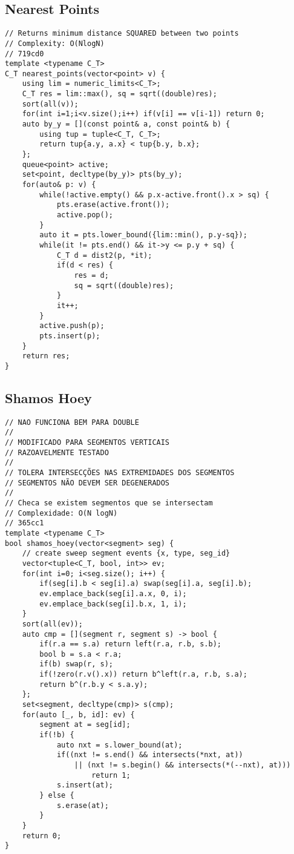 \documentclass{article}
\begin{document}
\subsection{Nearest Points}
\begin{verbatim}
// Returns minimum distance SQUARED between two points
// Complexity: O(NlogN)
// 719cd0
template <typename C_T>
C_T nearest_points(vector<point> v) {
	using lim = numeric_limits<C_T>;
	C_T res = lim::max(), sq = sqrt((double)res);
	sort(all(v));
	for(int i=1;i<v.size();i++) if(v[i] == v[i-1]) return 0;
	auto by_y = [](const point& a, const point& b) {
		using tup = tuple<C_T, C_T>;
		return tup{a.y, a.x} < tup{b.y, b.x};
	};
	queue<point> active;
	set<point, decltype(by_y)> pts(by_y);
	for(auto& p: v) {
		while(!active.empty() && p.x-active.front().x > sq) {
			pts.erase(active.front());
			active.pop();
		}
		auto it = pts.lower_bound({lim::min(), p.y-sq});
		while(it != pts.end() && it->y <= p.y + sq) {
			C_T d = dist2(p, *it);
			if(d < res) {
				res = d;
				sq = sqrt((double)res);
			}
			it++;
		}
		active.push(p);
		pts.insert(p);
	}
	return res;
}
\end{verbatim}
\subsection{Shamos Hoey}
\begin{verbatim}
// NAO FUNCIONA BEM PARA DOUBLE
//
// MODIFICADO PARA SEGMENTOS VERTICAIS
// RAZOAVELMENTE TESTADO
//
// TOLERA INTERSECÇÕES NAS EXTREMIDADES DOS SEGMENTOS
// SEGMENTOS NÃO DEVEM SER DEGENERADOS
//
// Checa se existem segmentos que se intersectam
// Complexidade: O(N logN)
// 365cc1
template <typename C_T>
bool shamos_hoey(vector<segment> seg) {
	// create sweep segment events {x, type, seg_id}
	vector<tuple<C_T, bool, int>> ev;
	for(int i=0; i<seg.size(); i++) {
		if(seg[i].b < seg[i].a) swap(seg[i].a, seg[i].b);
		ev.emplace_back(seg[i].a.x, 0, i);
		ev.emplace_back(seg[i].b.x, 1, i);
	}
	sort(all(ev));
	auto cmp = [](segment r, segment s) -> bool {
		if(r.a == s.a) return left(r.a, r.b, s.b);
		bool b = s.a < r.a;
		if(b) swap(r, s);
		if(!zero(r.v().x)) return b^left(r.a, r.b, s.a);
		return b^(r.b.y < s.a.y);
	};
	set<segment, decltype(cmp)> s(cmp);
	for(auto [_, b, id]: ev) {
		segment at = seg[id];
		if(!b) {
			auto nxt = s.lower_bound(at);
			if((nxt != s.end() && intersects(*nxt, at))
				|| (nxt != s.begin() && intersects(*(--nxt), at)))
					return 1;
			s.insert(at);
		} else {
			s.erase(at);
		}
	}
	return 0;
}
\end{verbatim}
\end{document}
